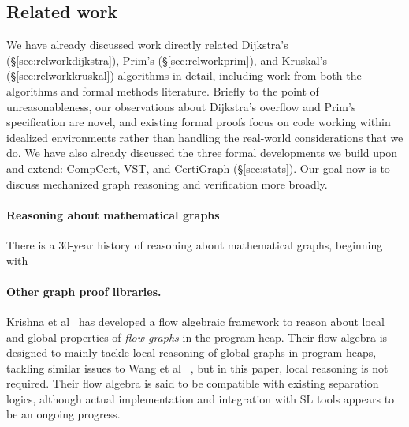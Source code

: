 \subsection{Related work}

We have already discussed work directly related Dijkstra's (\S\ref{sec:relworkdijkstra}), Prim's (\S\ref{sec:relworkprim}), and Kruskal's (\S\ref{sec:relworkkruskal}) algorithms in detail, including work from both the algorithms and formal methods literature.  Briefly to the point of unreasonableness, our observations about Dijkstra's overflow and Prim's specification are novel, and existing formal proofs focus on code working within idealized environments rather than handling the real-world considerations that we do.  We have also already discussed the three formal developments we
build upon and extend: CompCert, VST, and CertiGraph (\S\ref{sec:stats}).  Our goal now is to discuss mechanized graph reasoning and verification more broadly.

\paragraph{Reasoning about mathematical graphs}

There is a 30-year history of reasoning about mathematical graphs, beginning with 


\paragraph{Other graph proof libraries.} Krishna et al~\cite{DBLP:conf/esop/KrishnaSW20} has developed a flow algebraic framework to reason about local and global properties of \textit{flow graphs} in the program heap. Their flow algebra is designed to mainly tackle local reasoning of global graphs in program heaps, tackling similar issues to Wang et al ~\cite{DBLP:journals/pacmpl/WangCMH19}, but in this paper, local reasoning is not required. Their flow algebra is said to be compatible with existing separation logics, although actual implementation and integration with SL tools appears to be an ongoing progress.

